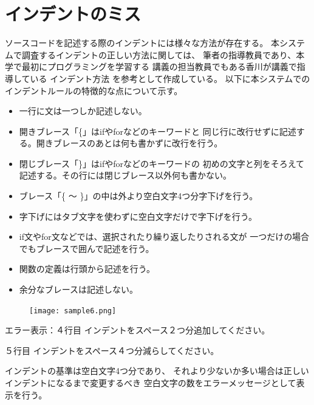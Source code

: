 \documentclass{csspaper}
\begin{document}
      \section{インデントのミス}
      ソースコードを記述する際のインデントには様々な方法が存在する。
      本システムで調査するインデントの正しい方法に関しては、
      筆者の指導教員であり、本学で最初にプログラミングを学習する
      講義の担当教員でもある香川が講義で指導している
      インデント方法 \cite{13}を参考として作成している。
      以下に本システムでのインデントルールの特徴的な点について示す。
      \begin{itemize}
         \item 一行に文は一つしか記述しない。
         
         \item 開きブレース「\{」はifやforなどのキーワードと
         同じ行に改行せずに記述する。開きブレースのあとは何も書かずに改行を行う。

         \item 閉じブレース「\}」はifやforなどのキーワードの
         初めの文字と列をそろえて記述する。その行には閉じブレース以外何も書かない。

         \item ブレース「\{ ～ \}」の中は外より空白文字4つ分字下げを行う。
         
         \item 字下げにはタブ文字を使わずに空白文字だけで字下げを行う。
         
         \item if文やfor文などでは、選択されたり繰り返したりされる文が
         一つだけの場合でもブレースで囲んで記述を行う。

         \item 関数の定義は行頭から記述を行う。
         
         \item 余分なブレースは記述しない。
      \end{itemize}

      \begin{figure}[h]
         \centering
         \texttt{[image: sample6.png]}
      \end{figure}

      エラー表示：４行目 インデントをスペース２つ分追加してください。

      ５行目 インデントをスペース４つ分減らしてください。

      インデントの基準は空白文字4つ分であり、
      それより少ないか多い場合は正しいインデントになるまで変更するべき
      空白文字の数をエラーメッセージとして表示を行う。
\end{document}
